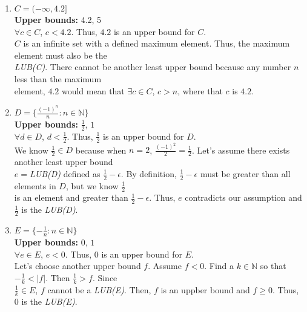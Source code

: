 \documentclass{article}
\begin{document}
\begin{flushleft}
\begin{enumerate}
\item $C = (-\infty, 4.2]$\\
\vspace{.3cm}
\qquad \textbf{Upper bounds:} 4.2, 5\\
\vspace{.3cm}
\qquad $\forall c \in C$, $c < 4.2$. Thus, $4.2$ is an upper bound for $C$. \\
\vspace{.3cm}
\qquad $C$ is an infinite set with a defined maximum element. Thus, the maximum element must also be the \\
\qquad \emph{LUB(C)}. There cannot be another least upper bound because any number $n$ less than the maximum \\
\qquad element, $4.2$ would  mean that $\exists c \in C$, $c > n$, where that $c$ is $4.2$. 
\vspace{.3cm}

\item $D = \{\frac{(-1)^n}{n} : n \in \mathbb{N}\}$\\
\vspace{.3cm}
\qquad \textbf{Upper bounds:} $\frac{1}{2}$, $1$\\
\vspace{.3cm}
\qquad $\forall d \in D$, $d < \frac{1}{2}$. Thus,  $\frac{1}{2}$ is an upper bound for $D$. \\
\vspace{.3cm}
\qquad We know $\frac{1}{2} \in D$ because when $n=2$, $\frac{(-1)^{2}}{2}=\frac{1}{2}$. Let's assume there exists another least upper bound \\ \qquad $e=$\emph{LUB(D)} defined as $\frac{1}{2}-\epsilon$. By definition, $\frac{1}{2}-\epsilon$ must be greater than all elements in $D$, but we know $\frac{1}{2}$ \\
\qquad is an element and greater than $\frac{1}{2}-\epsilon$. Thus, $e$ contradicts our assumption and $\frac{1}{2}$ is the \emph{LUB(D)}.\\
\vspace{.3cm}

\item $E =\{-\frac{1}{n} : n \in \mathbb{N}\}$\\

\vspace{.3cm}
\qquad \textbf{Upper bounds:} $0$, $1$\\
\vspace{.3cm}
\qquad $\forall e \in E$, $e < 0$. Thus, $0$ is an upper bound for $E$. \\
\vspace{.3cm}
\qquad Let's choose another upper bound $f$. Assume $f < 0$. Find a $k \in \mathbb{N}$ so that $-\frac{1}{k}< |f|$. Then $\frac{1}{k} > f$. Since \\
\qquad $\frac{1}{k} \in E$, $f$ cannot be a \emph{LUB(E)}. Then, $f$ is an uppber bound and $f \geq 0$. Thus, $0$ is the \emph{LUB(E)}.
\vspace{.3cm}


\end{enumerate}
\end{flushleft}
\end{document}
